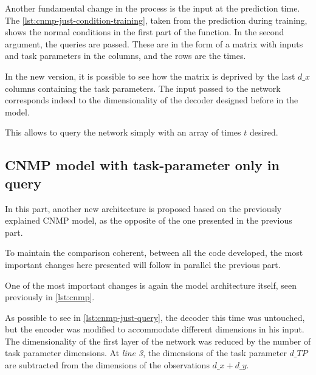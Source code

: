 

Another fundamental change in the process is the input at the prediction time. The \cref{lst:cnmp-just-condition-training}, taken from the prediction during training, shows the normal conditions in the first part of the function. In the second argument, the queries are passed. These are in the form of a matrix with inputs and task parameters in the columns, and the rows are the times.

In the new version, it is possible to see how the matrix is deprived by the last $d\_x$ columns containing the task parameters. The input passed to the network corresponds indeed to the dimensionality of the decoder designed before in the model.

This allows to query the network simply with an array of times $t$ desired. 



\subsection{CNMP model with task-parameter only in query}
In this part, another new architecture is proposed based on the previously explained CNMP model, as the opposite of the one presented in the previous part.

To maintain the comparison coherent, between all the code developed, the most important changes here presented will follow in parallel the previous part. 

One of the most important changes is again the model architecture itself, seen previously in \cref{lst:cnmp}.  



As possible to see in \cref{lst:cnmp-just-query}, the decoder this time was untouched, but the encoder was modified to accommodate different dimensions in his input. The dimensionality of the first layer of the network was reduced by the number of task parameter dimensions. At \emph{line 3}, the dimensions of the task parameter $d\_TP$ are subtracted from the dimensions of the observations $d\_x+d\_y$.



